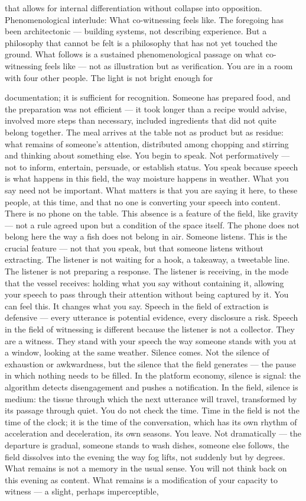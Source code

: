that allows for internal differentiation without collapse into opposition. Phenomenological interlude: What co-witnessing feels like. The foregoing has been architectonic — building systems, not describing experience. But a philosophy that cannot be felt is a philosophy that has not yet touched the ground. What follows is a sustained phenomenological passage on what co-witnessing feels like — not as illustration but as verification. You are in a room with four other people. The light is not bright enough for

documentation; it is sufficient for recognition. Someone has prepared food, and the preparation was not efficient — it took longer than a recipe would advise, involved more steps than necessary, included ingredients that did not quite belong together. The meal arrives at the table not as product but as residue: what remains of someone’s attention, distributed among chopping and stirring and thinking about something else. You begin to speak. Not performatively — not to inform, entertain, persuade, or establish status. You speak because speech is what happens in this field, the way moisture happens in weather. What you say need not be important. What matters is that you are saying it here, to these people, at this time, and that no one is converting your speech into content. There is no phone on the table. This absence is a feature of the field, like gravity — not a rule agreed upon but a condition of the space itself. The phone does not belong here the way a fish does not belong in air. Someone listens. This is the crucial feature — not that you speak, but that someone listens without extracting. The listener is not waiting for a hook, a takeaway, a tweetable line. The listener is not preparing a response. The listener is receiving, in the mode that the vessel receives: holding what you say without containing it, allowing your speech to pass through their attention without being captured by it. You can feel this. It changes what you say. Speech in the field of extraction is defensive — every utterance is potential evidence, every disclosure a risk. Speech in the field of witnessing is different because the listener is not a collector. They are a witness. They stand with your speech the way someone stands with you at a window, looking at the same weather. Silence comes. Not the silence of exhaustion or awkwardness, but the silence that the field generates — the pause in which nothing needs to be filled. In the platform economy, silence is signal: the algorithm detects disengagement and pushes a notification. In the field, silence is medium: the tissue through which the next utterance will travel, transformed by its passage through quiet. You do not check the time. Time in the field is not the time of the clock; it is the time of the conversation, which has its own rhythm of acceleration and deceleration, its own seasons. You leave. Not dramatically — the departure is gradual, someone stands to wash dishes, someone else follows, the field dissolves into the evening the way fog lifts, not suddenly but by degrees. What remains is not a memory in the usual sense. You will not think back on this evening as content. What remains is a modification of your capacity to witness — a slight, perhaps imperceptible, 